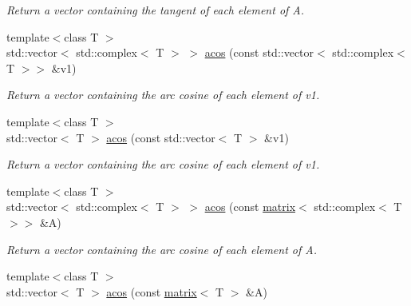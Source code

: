 \begin{DoxyCompactItemize}
\begin{DoxyCompactList}\small\item\em Return a vector containing the tangent of each element of A. \end{DoxyCompactList}\item 
\hypertarget{namespacekeycpp_a08fac66d81dbcfce4d57bd08b3810dbf}{{\footnotesize template$<$class T $>$ }\\std\-::vector$<$ std\-::complex$<$ T $>$ $>$ \hyperlink{namespacekeycpp_a08fac66d81dbcfce4d57bd08b3810dbf}{acos} (const std\-::vector$<$ std\-::complex$<$ T $>$$>$ \&v1)}\label{namespacekeycpp_a08fac66d81dbcfce4d57bd08b3810dbf}

\begin{DoxyCompactList}\small\item\em Return a vector containing the arc cosine of each element of v1. \end{DoxyCompactList}\item 
\hypertarget{namespacekeycpp_a01c85865832f197d01d4f332121bc018}{{\footnotesize template$<$class T $>$ }\\std\-::vector$<$ T $>$ \hyperlink{namespacekeycpp_a01c85865832f197d01d4f332121bc018}{acos} (const std\-::vector$<$ T $>$ \&v1)}\label{namespacekeycpp_a01c85865832f197d01d4f332121bc018}

\begin{DoxyCompactList}\small\item\em Return a vector containing the arc cosine of each element of v1. \end{DoxyCompactList}\item 
\hypertarget{namespacekeycpp_a88bedf42ff19672e0ddff3c5547d28d2}{{\footnotesize template$<$class T $>$ }\\std\-::vector$<$ std\-::complex$<$ T $>$ $>$ \hyperlink{namespacekeycpp_a88bedf42ff19672e0ddff3c5547d28d2}{acos} (const \hyperlink{classkeycpp_1_1matrix}{matrix}$<$ std\-::complex$<$ T $>$$>$ \&A)}\label{namespacekeycpp_a88bedf42ff19672e0ddff3c5547d28d2}

\begin{DoxyCompactList}\small\item\em Return a vector containing the arc cosine of each element of A. \end{DoxyCompactList}\item 
\hypertarget{namespacekeycpp_acf579fcfa75e569f491946af9e09ba34}{{\footnotesize template$<$class T $>$ }\\std\-::vector$<$ T $>$ \hyperlink{namespacekeycpp_acf579fcfa75e569f491946af9e09ba34}{acos} (const \hyperlink{classkeycpp_1_1matrix}{matrix}$<$ T $>$ \&A)}\label{namespacekeycpp_acf579fcfa75e569f491946af9e09ba34}


\end{DoxyCompactItemize}
